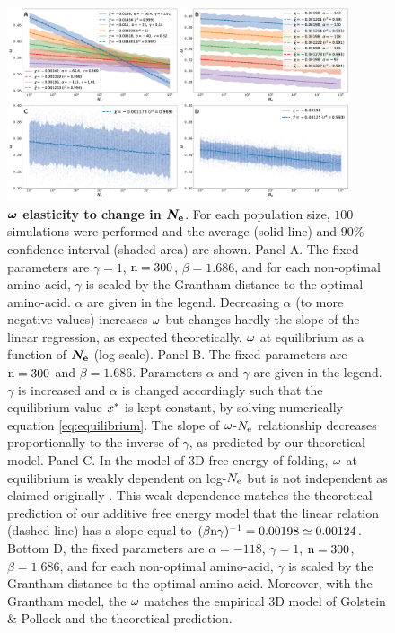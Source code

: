 \documentclass{article}
\begin{document}
\begin{figure}[htb!]
\begin{mdframed}
\centering
\includegraphics[width=0.9\textwidth] {artworks/Elasticity.png}
 \caption{
  \textbf{$\bm{\omega}$ elasticity to change in $\bm{N_{\mathrm{e}}}$}.
  For each population size, $100$ simulations were performed and the average (solid line) and $90\%$ confidence interval (shaded area) are shown.
  Panel A. The fixed parameters are $\gamma=1$, $\text{n}=300$, $\beta=1.686$, and for each non-optimal amino-acid, $\gamma$ is scaled by the Grantham distance to the optimal amino-acid. $\alpha$ are given in the legend. Decreasing $\alpha$ (to more negative values) increases $\omega$ but changes hardly the slope of the linear regression, as expected theoretically.
  $\omega$ at equilibrium as a function of $\bm{N_{\mathrm{e}}}$ (log scale).
  Panel B. The fixed parameters are $\text{n}=300$ and $\beta=1.686$. Parameters $\alpha$ and $\gamma$ are given in the legend.
  $\gamma$ is increased and $\alpha$ is changed accordingly such that the equilibrium value $x^{*}$ is kept constant, by solving numerically equation \ref{eq:equilibrium}.
  The slope of $\omega$-$N_{\mathrm{e}}$ relationship decreases proportionally to the inverse of $\gamma$, as predicted by our theoretical model.
  Panel C. In the model of 3D free energy of folding, $\omega$ at equilibrium is weakly dependent on log-$N_{\mathrm{e}}$ but is not independent as claimed originally \cite{Goldstein2013}.
  This weak dependence matches the theoretical prediction of our additive free energy model that the linear relation (dashed line) has a slope equal to $(\beta \text{n} \gamma)^{-1} = 0.00198 \simeq 0.00124$.
  Bottom D, the fixed parameters are $\alpha=-118$, $\gamma=1$, $\text{n}=300$, $\beta=1.686$, and for each non-optimal amino-acid, $\gamma$ is scaled by the Grantham distance to the optimal amino-acid.
  Moreover, with the Grantham model, the $\omega$ matches the empirical 3D model of Golstein \& Pollock and the theoretical prediction.
  \label{fig:GoldsteinVsToy}
 }
\end{mdframed}
\end{figure}
\end{document}
